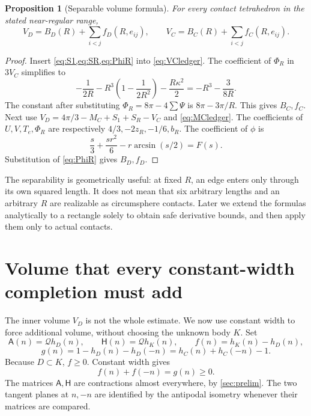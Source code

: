 \documentclass[11pt]{article}
\numberwithin{equation}{section}
\newtheorem{proposition}[theorem]{Proposition}
\theoremstyle{definition}\newtheorem{definition}[theorem]{Definition}
\theoremstyle{remark}\newtheorem{remark}[theorem]{Remark}
\newcommand{\Qh}{\mathcal Q}
\newcommand{\cA}{\mathsf A}
\newcommand{\cH}{\mathsf H}
\begin{document}
\begin{proposition}[Separable volume formula]\label{prop:volumes}
For every contact tetrahedron in the stated near-regular range,
\begin{equation}\label{eq:separable}
 \boxed{V_D=B_D(R)+\sum_{i<j}f_D(R,e_{ij}),\qquad
 V_C=B_C(R)+\sum_{i<j}f_C(R,e_{ij}).}
\end{equation}
\end{proposition}
\begin{proof}
Insert \cref{eq:S1,eq:SR,eq:PhiR} into \cref{eq:VCledger}. The coefficient
of $\Phi_R$ in $3V_C$ simplifies to
\[
 -\frac1{2R}-R^3\left(1-\frac1{2R^2}\right)
                    -\frac{R\kappa^2}{2}
 =-R^3-\frac3{8R}.
\]
The constant after substituting $\Phi_R=8\pi-4\sum\Psi$ is
$8\pi-3\pi/R$. This gives $B_C,f_C$. Next use
$V_D=4\pi/3-M_C+S_1+S_R-V_C$ and \cref{eq:MCledger}.
The coefficients of $U,V,T_e,\Phi_R$ are respectively $4/3,-2z_R,-1/6,b_R$.
The coefficient of $\phi$ is
\[
 \frac s3+\frac{sr^2}{6}-r\arcsin(s/2)=F(s).
\]
Substitution of \cref{eq:PhiR} gives $B_D,f_D$.
\end{proof}
The separability is geometrically useful: at fixed $R$, an edge enters only
through its own squared length. It does not mean that six arbitrary lengths
and an arbitrary $R$ are realizable as circumsphere contacts. Later we extend
the formulas analytically to a rectangle solely to obtain safe derivative
bounds, and then apply them only to actual contacts.

\section{Volume that every constant-width completion must add}\label{sec:completion}
The inner volume $V_D$ is not the whole estimate. We now use constant width
to force additional volume, without choosing the unknown body $K$.
Set
\[
 \cA(n)=\Qh h_D(n),\qquad\cH(n)=\Qh h_K(n),\qquad
 f(n)=h_K(n)-h_D(n),
\]
\begin{equation}\label{eq:gapdef}
 g(n)=1-h_D(n)-h_D(-n)=h_C(n)+h_C(-n)-1.
\end{equation}
Because $D\subset K$, $f\ge0$. Constant width gives
\begin{equation}\label{eq:fpaired}
 f(n)+f(-n)=g(n)\ge0.
\end{equation}
The matrices $\cA,\cH$ are contractions almost everywhere, by
\cref{sec:prelim}. The two tangent planes at $n,-n$ are identified by the
antipodal isometry whenever their matrices are compared.
\end{document}
